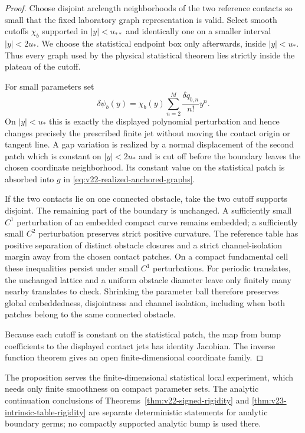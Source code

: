\begin{proof}
Choose disjoint arclength neighborhoods of the two reference contacts so
small that the fixed laboratory graph representation is valid.  Select smooth
cutoffs $\chi_b$ supported in $|y|<u_{**}$ and identically one on a smaller
interval $|y|<2u_*$.  We choose the statistical endpoint box only afterwards,
inside $|y|<u_*$.  Thus every graph used by the physical statistical theorem
lies strictly inside the plateau of the cutoff.

For small parameters set
\begin{equation}\label{eq:v22-local-bump}
 \delta\psi_b(y)
 =\chi_b(y)\sum_{n=2}^M\frac{\delta q_{b,n}}{n!}y^n.
\end{equation}
On $|y|<u_*$ this is exactly the displayed polynomial perturbation and hence
changes precisely the prescribed finite jet without moving the contact
origin or tangent line.  A gap variation is realized by a normal displacement
of the second patch which is constant on $|y|<2u_*$ and is cut off before the
boundary leaves the chosen coordinate neighborhood.  Its constant value on
the statistical patch is absorbed into $g$ in
\eqref{eq:v22-realized-anchored-graphs}.

If the two contacts lie on one connected obstacle, take the two cutoff
supports disjoint.  The remaining part of the boundary is unchanged.  A
sufficiently small $C^1$ perturbation of an embedded compact curve remains
embedded; a sufficiently small $C^2$ perturbation preserves strict positive
curvature.  The reference table has positive separation of distinct obstacle
closures and a strict channel-isolation margin away from the chosen contact
patches.  On a compact fundamental cell these inequalities persist under
small $C^1$ perturbations.  For periodic translates, the unchanged lattice
and a uniform obstacle diameter leave only finitely many nearby translates to
check.  Shrinking the parameter ball therefore preserves global embeddedness,
disjointness and channel isolation, including when both patches belong to the
same connected obstacle.

Because each cutoff is constant on the statistical patch, the map from bump
coefficients to the displayed contact jets has identity Jacobian.  The
inverse function theorem gives an open finite-dimensional coordinate family.
\end{proof}

\begin{remark}
The proposition serves the finite-dimensional statistical local experiment,
which needs only finite smoothness on compact parameter sets.  The analytic
continuation conclusions of Theorems~\ref{thm:v22-signed-rigidity} and
\ref{thm:v23-intrinsic-table-rigidity} are separate deterministic
statements for analytic boundary germs; no compactly supported analytic bump
is used there.
\end{remark}
